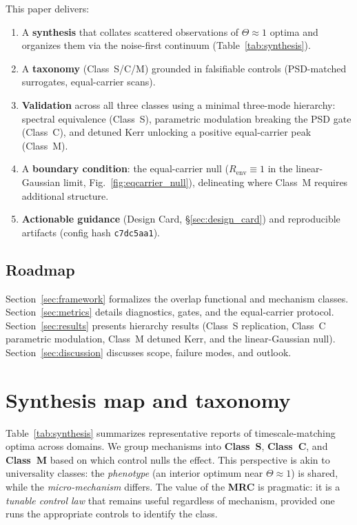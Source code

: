 \documentclass[11pt,letterpaper]{article}
\DeclareRobustCommand{\mrc}{\textbf{MRC}\xspace}
\DeclareRobustCommand{\classS}{\textbf{Class~S}\xspace}
\DeclareRobustCommand{\classC}{\textbf{Class~C}\xspace}
\DeclareRobustCommand{\classM}{\textbf{Class~M}\xspace}
\begin{document}
This paper delivers:
\begin{enumerate}[leftmargin=*,noitemsep,topsep=0pt]
\item A \textbf{synthesis} that collates scattered observations of 
$\Theta\approx 1$ optima and organizes them via the noise-first 
continuum (Table~\ref{tab:synthesis}).
\item A \textbf{taxonomy} (Class~S/C/M) grounded in falsifiable controls 
(PSD-matched surrogates, equal-carrier scans).
\item \textbf{Validation} across all three classes using a minimal 
three-mode hierarchy: spectral equivalence (Class~S), parametric 
modulation breaking the PSD gate (Class~C), and detuned Kerr unlocking a 
positive equal-carrier peak (Class~M).
\item A \textbf{boundary condition}: the equal-carrier null 
($R_{\text{env}} \equiv 1$ in the linear-Gaussian limit, 
Fig.~\ref{fig:eqcarrier_null}), delineating where Class~M requires 
additional structure.
\item \textbf{Actionable guidance} (Design Card, §\ref{sec:design_card}) 
and reproducible artifacts (config hash \texttt{c7dc5aa1}).
\end{enumerate}

\subsection{Roadmap}

Section~\ref{sec:framework} formalizes the overlap functional and 
mechanism classes. Section~\ref{sec:metrics} details diagnostics, gates, 
and the equal-carrier protocol. Section~\ref{sec:results} presents 
hierarchy results (Class~S replication, Class~C parametric modulation, 
Class~M detuned Kerr, and the linear-Gaussian null). 
Section~\ref{sec:discussion} discusses scope, failure modes, and outlook.

\section{Synthesis map and taxonomy}
Table~\ref{tab:synthesis} summarizes representative reports of timescale-matching optima across domains. We group mechanisms into \classS{}, \classC{}, and \classM{} based on which control nulls the effect. This perspective is akin to universality classes: the \emph{phenotype} (an interior optimum near $\Theta\!\approx\!1$) is shared, while the \emph{micro-mechanism} differs. The value of the \mrc is pragmatic: it is a \emph{tunable control law} that remains useful regardless of mechanism, provided one runs the appropriate controls to identify the class.
\end{document}
